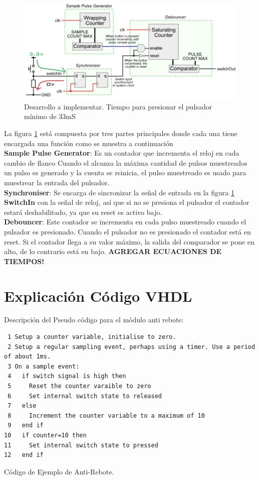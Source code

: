 \documentclass[paper=a4, fontsize=12pt]{article} 		%
\numberwithin{equation}{section}						%
\numberwithin{table}{section} 							%
\begin{document}
\begin{figure}[H]
  \centering
     \includegraphics[width=1\textwidth]{implementacion}
  \caption{Desarrollo a implementar. Tiempo para presionar el pulsador mínimo de 33mS}
  \label{fig:eliteimplemetacion}
\end{figure}
La figura \ref{fig:eliteimplemetacion} está compuesta por tres partes principales donde cada una tiene encargada una función como se muestra  a continuación\\
\newline
\textbf{Sample Pulse Generator}: Es un contador que incrementa el reloj en cada cambio de flanco Cuando el alcanza la máxima cantidad de pulsos muestreados un pulso es generado y la cuenta se reinicia, el pulso muestreado es usado para muestrear la entrada del pulsador.\\
\newline
\textbf{Synchroniser}: Se encarga de sincronizar la señal de entrada en la figura \ref{fig:eliteimplemetacion} \textbf{SwitchIn} con la señal de reloj, así que si no se presiona el pulsador el contador estará deshabilitado, ya que su reset es activo bajo.\\
\newline
\textbf{Debouncer}: Este contador se incrementa en cada pulso muestreado cuando el pulsador es presionado. Cuando el pulsador no es presionado el contador está en reset. Si el contador llega a su valor máximo, la salida del comparador se pone en alto, de lo contrario está en bajo.
\textbf{AGREGAR ECUACIONES DE TIEMPOS!}
\newline
\section{Explicación Código VHDL}
Descripción del Pseudo código para el módulo anti rebote:
\begin{verbatim}
 1 Setup a counter variable, initialise to zero.
 2 Setup a regular sampling event, perhaps using a timer. Use a period of about 1ms.
 3 On a sample event:
 4   if switch signal is high then
 5     Reset the counter varaible to zero
 6     Set internal switch state to released
 7   else
 8     Increment the counter variable to a maximum of 10
 9   end if
10   if counter=10 then
11     Set internal switch state to pressed
12   end if
\end{verbatim}
Código de Ejemplo de Anti-Rebote.
\end{document}
